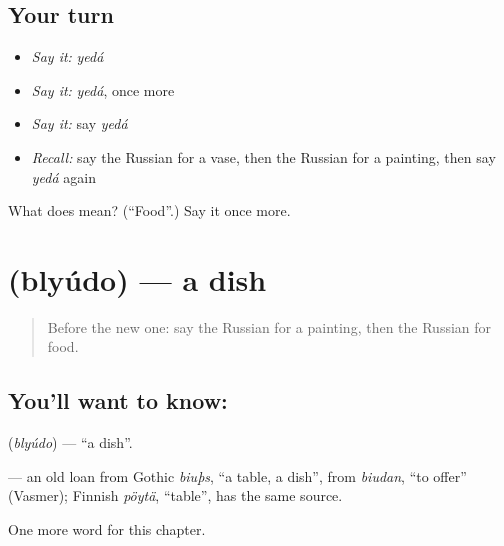 \subsection*{Your turn}
\begin{itemize}
\raggedright
  \item \emph{Say it:} \emph{yedá}
  \item \emph{Say it:} \emph{yedá}, once more
  \item \emph{Say it:} say \emph{yedá}
  \item \emph{Recall:} say the Russian for a vase, then the Russian for a painting, then say \emph{yedá} again
\end{itemize}

\begin{tcolorbox}[breakable,colback=teal!4,colframe=teal!35!black,title={Before you move on}]
What does  mean? (\textquotedblleft{}Food\textquotedblright{}.) Say it once more.
\end{tcolorbox}
\section[\texorpdfstring{\ru{блюдо} (blyúdo)}{блюдо (blyúdo)}]{ (blyúdo) — a dish}

\label{lesson:RU-C222-blyudo}



\begin{quote}
Before the new one: say the Russian for a painting, then the Russian for food.
\end{quote}

\subsection*{You'll want to know: }
\textbf{} (\emph{blyúdo}) — \textquotedblleft{}a dish\textquotedblright{}.

\begin{cousinweb}
\textbf{} — an old loan from Gothic \emph{biuþs}, \textquotedblleft{}a table, a dish\textquotedblright{}, from \emph{biudan}, \textquotedblleft{}to offer\textquotedblright{} (Vasmer); Finnish \emph{pöytä}, \textquotedblleft{}table\textquotedblright{}, has the same source.
\end{cousinweb}

\begin{grammarlens}[title={What you've built}]
One more word for this chapter.
\end{grammarlens}

